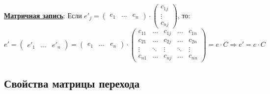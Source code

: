 \documentclass[12pt]{article}
\theoremstyle{definition}
\begin{document}
\textbf{\uline{Матричная запись}}: Если $e'_j = 
	\begin{pmatrix}
		e_1 & \dotsc & e_n
	\end{pmatrix}{\cdot}
	\begin{pmatrix}
		c_{1j}\\
		\vdots\\
		c_{nj}
	\end{pmatrix} $, то:
$$
	e' = 
	\begin{pmatrix}
		e'_1 & \dotsc & e'_n
	\end{pmatrix} = 
	\begin{pmatrix}
		e_1 & \dotsc & e_n
	\end{pmatrix}{\cdot}
	\begin{pmatrix}
		c_{11} & \dotsc & c_{1j} & \dotsc  & c_{1n} \\
		c_{21} & \dotsc & c_{2j} & \dotsc & c_{2n}\\
		\vdots & \ddots & \vdots & \ddots & \vdots\\
		c_{n1} & \dotsc & c_{nj} & \dotsc & c_{nn}
	\end{pmatrix} = e{\cdot}C \Rightarrow e' = e{\cdot}C
$$

\newpage
\subsection*{Свойства матрицы перехода}
\end{document}
